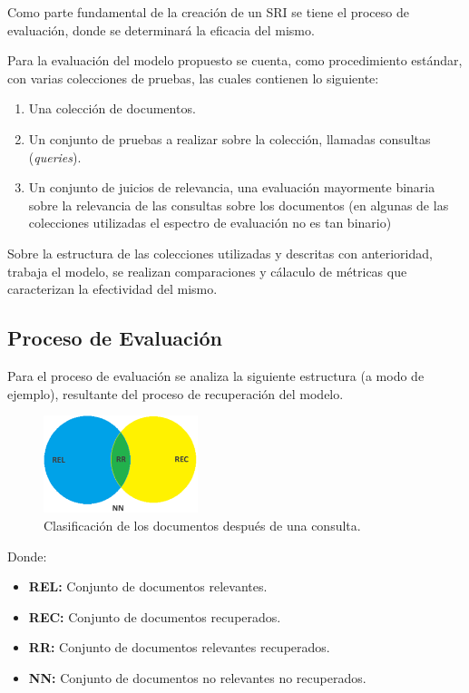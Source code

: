 Como parte fundamental de la creación de un SRI se tiene el proceso de
evaluación, donde se determinará la eficacia del mismo.

Para la evaluación del modelo propuesto se cuenta, como procedimiento estándar,
con varias colecciones de pruebas, las cuales contienen lo siguiente:

\begin{enumerate}
    \item Una colección de documentos.
    \item Un conjunto de pruebas a realizar sobre la colección, llamadas
    consultas (\emph{queries}).
    \item Un conjunto de juicios de relevancia, una evaluación mayormente
    binaria sobre la relevancia de las consultas sobre los documentos (en
    algunas de las colecciones utilizadas el espectro de evaluación no es tan
    binario) 
\end{enumerate}

Sobre la estructura de las colecciones utilizadas y descritas con anterioridad,
trabaja el modelo, se realizan comparaciones y cálaculo de métricas que
caracterizan la efectividad del mismo.

\subsection{Proceso de Evaluación}

Para el proceso de evaluación se analiza la siguiente estructura (a modo de
ejemplo), resultante del proceso de recuperación del modelo.

\begin{figure}[h!]%
    \centering
	\includegraphics[width=0.4\textwidth]{./sri_03.png}
	\caption{Clasificación de los documentos después de una consulta.}
	\label{fig:docSet}
\end{figure}

Donde:
\begin{itemize}
    \item {\bf REL:} Conjunto de documentos relevantes.
    \item {\bf REC:} Conjunto de documentos recuperados.
    \item {\bf RR:} Conjunto de documentos relevantes recuperados.
    \item {\bf NN:} Conjunto de documentos no relevantes no recuperados.
\end{itemize}

